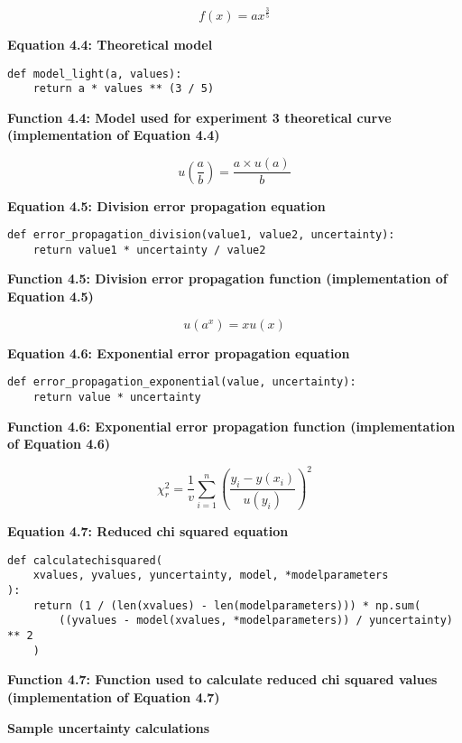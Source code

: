 \documentclass[
	letterpaper, %
	10pt, %
]{CSUniSchoolLabReport}
\begin{document}
$$f(x) = ax^{\frac35}$$
\begin{center}
	\textbf{Equation 4.4: Theoretical model}
\end{center}
\newpage
\begin{verbatim}
def model_light(a, values):
    return a * values ** (3 / 5)
\end{verbatim}
\begin{center}
	\textbf{Function 4.4: Model used for experiment 3 theoretical curve  (implementation of Equation 4.4)}\\
\end{center}

$$u\left(\frac ab\right) = \frac{a\times u(a)}{b}$$
\begin{center}
	\textbf{Equation 4.5: Division error propagation equation}
\end{center}
\begin{verbatim}
def error_propagation_division(value1, value2, uncertainty):
    return value1 * uncertainty / value2
\end{verbatim}
\begin{center}
    \textbf{Function 4.5: Division error propagation function (implementation of Equation 4.5)}\\
\end{center}


$$u(a^x) = x u(x)$$
\begin{center}
	\textbf{Equation 4.6: Exponential error propagation equation}
\end{center}
\begin{verbatim}
def error_propagation_exponential(value, uncertainty):
    return value * uncertainty
\end{verbatim}
\begin{center}
    \textbf{Function 4.6: Exponential error propagation function (implementation of Equation 4.6)}\\
\end{center}

$$ \chi^2_r = \frac{1}{v}\sum^{n}_{i=1}{\left(\frac{y_i - y(x_i)}{u(y_i)}\right)^2}$$
\begin{center}
	\textbf{Equation 4.7: Reduced chi squared equation}
\end{center}

\begin{verbatim}
def calculatechisquared(
    xvalues, yvalues, yuncertainty, model, *modelparameters
):
    return (1 / (len(xvalues) - len(modelparameters))) * np.sum(
        ((yvalues - model(xvalues, *modelparameters)) / yuncertainty) ** 2
    )
\end{verbatim}
\begin{center}
\textbf{Function 4.7: Function used to calculate reduced chi squared values (implementation of Equation 4.7)}
\end{center}
\vspace{20pt}
\newpage
{\Large\textbf{Sample uncertainty calculations}}\\
\end{document}

